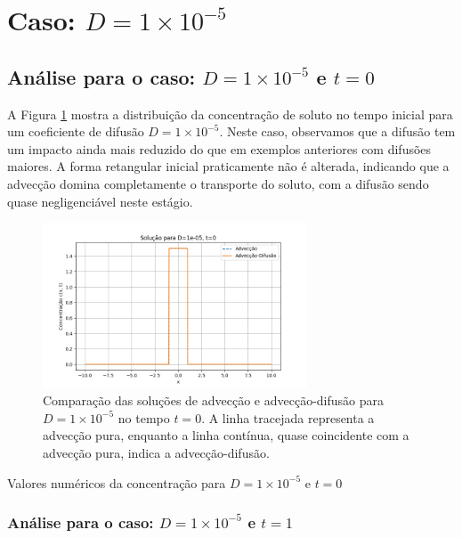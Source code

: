 \section*{Caso: \( D = 1 \times 10^{-5} \)}


\subsection*{Análise para o caso: \( D = 1 \times 10^{-5} \) e \( t = 0 \)}
A Figura \ref{fig:advec_diffus_1e-05_t0} mostra a distribuição da concentração de soluto no tempo inicial para um coeficiente de difusão \( D = 1 \times 10^{-5} \). Neste caso, observamos que a difusão tem um impacto ainda mais reduzido do que em exemplos anteriores com difusões maiores. A forma retangular inicial praticamente não é alterada, indicando que a advecção domina completamente o transporte do soluto, com a difusão sendo quase negligenciável neste estágio.

\begin{figure}[H]
    \centering
    \includegraphics[width=0.7\textwidth]{code/plot/Advec_Difus_t0_D1e-05.png}
    \caption{Comparação das soluções de advecção e advecção-difusão para \( D = 1 \times 10^{-5} \) no tempo \( t = 0 \). A linha tracejada representa a advecção pura, enquanto a linha contínua, quase coincidente com a advecção pura, indica a advecção-difusão.}
    \label{fig:advec_diffus_1e-05_t0}
\end{figure}

\begin{table}[H]
    \centering
    \caption{Valores numéricos da concentração para \( D = 1 \times 10^{-5} \) e \( t = 0 \)}
    
\end{table}


\subsubsection{Análise para o caso: \( D = 1 \times 10^{-5} \) e \( t = 1 \)}

